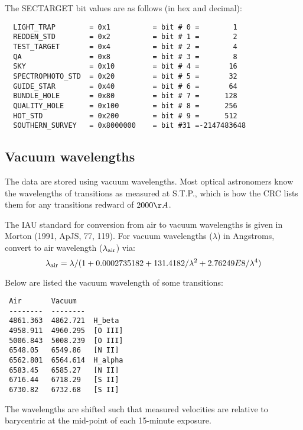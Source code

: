 \documentclass[12pt,preprint]{aastex}
\begin{document}
The SECTARGET bit values are as follows (in hex and decimal):
\begin{verbatim}
  LIGHT_TRAP        = 0x1          = bit # 0 =        1
  REDDEN_STD        = 0x2          = bit # 1 =        2
  TEST_TARGET       = 0x4          = bit # 2 =        4
  QA                = 0x8          = bit # 3 =        8
  SKY               = 0x10         = bit # 4 =       16
  SPECTROPHOTO_STD  = 0x20         = bit # 5 =       32
  GUIDE_STAR        = 0x40         = bit # 6 =       64
  BUNDLE_HOLE       = 0x80         = bit # 7 =      128
  QUALITY_HOLE      = 0x100        = bit # 8 =      256
  HOT_STD           = 0x200        = bit # 9 =      512
  SOUTHERN_SURVEY   = 0x8000000    = bit #31 =-2147483648
\end{verbatim}

\subsection{Vacuum wavelengths}

The data are stored using vacuum wavelengths.
Most optical astronomers know the wavelengths of transitions
as measured at S.T.P., which is how the CRC lists them for any
transitions redward of $2000\AA$.

The IAU standard for conversion from air to vacuum wavelengths
is given in Morton (1991, ApJS, 77, 119). For vacuum wavelengths ($\lambda$)
in Angstroms, convert to air wavelength ($\lambda_{\rm air}$) via:
$$\lambda_{\rm air} = \lambda / (1 + 0.0002735182 + 131.4182 / \lambda^2 + 2.76249E8 / \lambda^4) $$

Below are listed the vacuum wavelength of some transitions:
\begin{verbatim}
 Air       Vacuum
 --------  --------
 4861.363  4862.721  H_beta
 4958.911  4960.295  [O III]
 5006.843  5008.239  [O III]
 6548.05   6549.86   [N II]
 6562.801  6564.614  H_alpha
 6583.45   6585.27   [N II]
 6716.44   6718.29   [S II]
 6730.82   6732.68   [S II]
\end{verbatim}
The wavelengths are shifted such that measured velocities are relative
to barycentric at the mid-point of each 15-minute exposure.


\begin{figure}
\end{figure}
\end{document}
